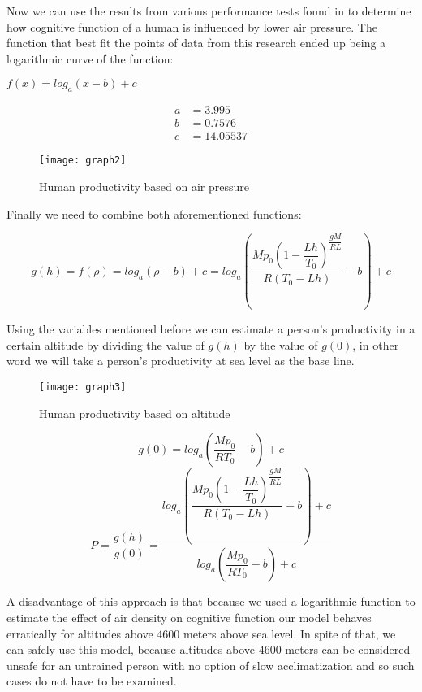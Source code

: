 Now we can use the results from various performance tests found in \cite{Research1996} to determine how cognitive function of a human is influenced by lower air pressure. The function that best fit the points of data from this research ended up being a logarithmic curve of the function:
\begin{center}
$f(x)=log_a\left(x-b\right)+c$
\end{center}
\begin{align*}
a &= 3.995\\
b &= 0.7576\\
c &= 14.05537
\end{align*}

\begin{figure}[ht]
	\centering
    	\texttt{[image: graph2]}
    \caption{Human productivity based on air pressure}
\end{figure}

Finally we need to combine both aforementioned functions:

$$g(h)=f(\rho)=log_a\left(\rho-b\right)+c=log_a\left(\dfrac{M p_0 \left(1-\dfrac{Lh}{T_0}\right)^{\dfrac{gM}{RL}}  }{ R (T_0-Lh)  }-b\right)+c$$

Using the variables mentioned before we can estimate a person's productivity in a certain altitude by dividing the value of $g(h)$ by the value of $g(0)$, in other word we will take a person's productivity at sea level as the base line. 

\begin{figure}[ht]
	\centering
    	\texttt{[image: graph3]}
    \caption{Human productivity based on altitude}
\end{figure}

$$ g(0) = log_a\left(\dfrac{M p_0 }{ R T_0  }-b\right)+c$$
$$P = \frac{g(h)}{g(0)} = \frac{ log_a\left(\dfrac{M p_0 \left(1-\dfrac{Lh}{T_0}\right)^{\dfrac{gM}{RL}}  }{ R (T_0-Lh)  }-b\right)+c }{ log_a\left(\dfrac{M p_0 }{ R T_0  }-b\right)+c }$$

A disadvantage of this approach is that because we used a logarithmic function to estimate the effect of air density on cognitive function our model behaves erratically for altitudes above $4600$ meters above sea level. In spite of that, we can safely use this model, because altitudes above $4600$ meters can be considered unsafe for an untrained person with no option of slow acclimatization and so such cases do not have to be examined.



